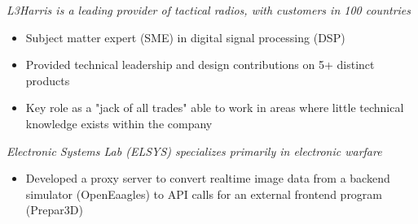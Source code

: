 
\begin{samepage}
\newline
{}
\newline
{}
\newline
\textit{L3Harris is a leading provider of tactical radios, with customers in 100 countries}
\begin{itemize}[noitemsep,topsep=0pt,parsep=0pt,partopsep=0pt]
    \item Subject matter expert (SME) in digital signal processing (DSP)
    \item Provided technical leadership and design contributions on 5+ distinct products
    \item Key role as a "jack of all trades" able to work in areas where little technical knowledge exists within the company
\end{itemize}
\end{samepage}

\smallskip

\begin{samepage}
\newline
\textit{Electronic Systems Lab (ELSYS) specializes primarily in electronic warfare}
\begin{itemize}[noitemsep,topsep=0pt,parsep=0pt,partopsep=0pt]
    \item Developed a proxy server to convert realtime image data from a backend simulator (OpenEaagles) to API calls for an external frontend program (Prepar3D)
\end{itemize}
\end{samepage}

